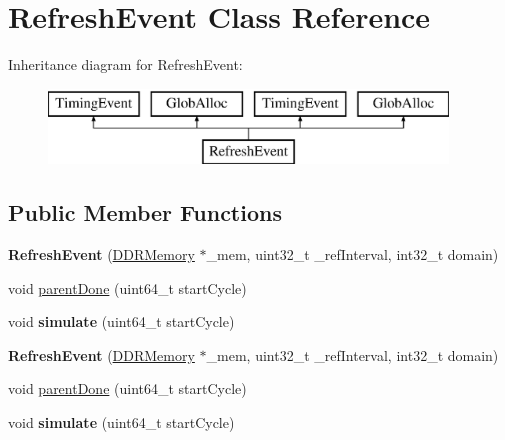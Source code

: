 \hypertarget{classRefreshEvent}{\section{Refresh\-Event Class Reference}
\label{classRefreshEvent}
}
Inheritance diagram for Refresh\-Event\-:\begin{figure}[H]
\begin{center}
\leavevmode
\includegraphics[height=2.000000cm]{classRefreshEvent}
\end{center}
\end{figure}
\subsection*{Public Member Functions}
\begin{DoxyCompactItemize}
\item 
\hypertarget{classRefreshEvent_acefefeb788013a0365ed66ba2296c211}{{\bfseries Refresh\-Event} (\hyperlink{classDDRMemory}{D\-D\-R\-Memory} $\ast$\-\_\-mem, uint32\-\_\-t \-\_\-ref\-Interval, int32\-\_\-t domain)}\label{classRefreshEvent_acefefeb788013a0365ed66ba2296c211}

\item 
void \hyperlink{classRefreshEvent_af9afce48ab90b3acbbe9c72bd5f7e552}{parent\-Done} (uint64\-\_\-t start\-Cycle)
\item 
\hypertarget{classRefreshEvent_a159c719260c727b66a28db40f8198dc7}{void {\bfseries simulate} (uint64\-\_\-t start\-Cycle)}\label{classRefreshEvent_a159c719260c727b66a28db40f8198dc7}

\item 
\hypertarget{classRefreshEvent_acefefeb788013a0365ed66ba2296c211}{{\bfseries Refresh\-Event} (\hyperlink{classDDRMemory}{D\-D\-R\-Memory} $\ast$\-\_\-mem, uint32\-\_\-t \-\_\-ref\-Interval, int32\-\_\-t domain)}\label{classRefreshEvent_acefefeb788013a0365ed66ba2296c211}

\item 
void \hyperlink{classRefreshEvent_af9afce48ab90b3acbbe9c72bd5f7e552}{parent\-Done} (uint64\-\_\-t start\-Cycle)
\item 
\hypertarget{classRefreshEvent_a159c719260c727b66a28db40f8198dc7}{void {\bfseries simulate} (uint64\-\_\-t start\-Cycle)}\label{classRefreshEvent_a159c719260c727b66a28db40f8198dc7}

\end{DoxyCompactItemize}
